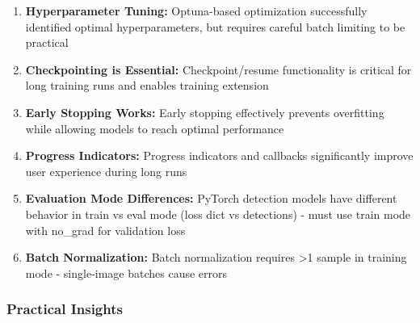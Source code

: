 \documentclass[12pt,a4paper]{article}
\begin{document}
\begin{enumerate}
    \item \textbf{Hyperparameter Tuning:} Optuna-based optimization successfully identified optimal hyperparameters, but requires careful batch limiting to be practical
    \item \textbf{Checkpointing is Essential:} Checkpoint/resume functionality is critical for long training runs and enables training extension
    \item \textbf{Early Stopping Works:} Early stopping effectively prevents overfitting while allowing models to reach optimal performance
    \item \textbf{Progress Indicators:} Progress indicators and callbacks significantly improve user experience during long runs
    \item \textbf{Evaluation Mode Differences:} PyTorch detection models have different behavior in train vs eval mode (loss dict vs detections) - must use train mode with no\_grad for validation loss
    \item \textbf{Batch Normalization:} Batch normalization requires >1 sample in training mode - single-image batches cause errors
\end{enumerate}

\subsubsection{Practical Insights}
\end{document}
